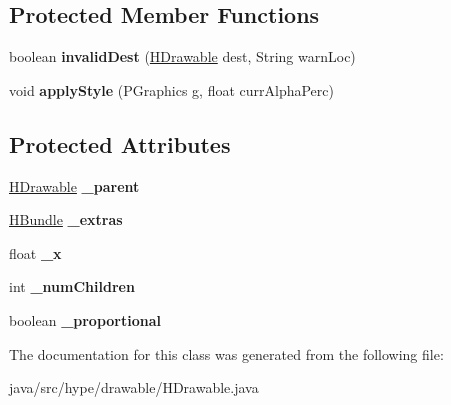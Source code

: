 \subsection*{Protected Member Functions}
\begin{DoxyCompactItemize}
\item 
\hypertarget{classhype_1_1drawable_1_1_h_drawable_a837e3abd69d85cd63b8e602eeba523d1}{boolean {\bfseries invalid\-Dest} (\hyperlink{classhype_1_1drawable_1_1_h_drawable}{H\-Drawable} dest, String warn\-Loc)}\label{classhype_1_1drawable_1_1_h_drawable_a837e3abd69d85cd63b8e602eeba523d1}

\item 
\hypertarget{classhype_1_1drawable_1_1_h_drawable_a1888aed57c719a397222b9e82ed08a4e}{void {\bfseries apply\-Style} (P\-Graphics g, float curr\-Alpha\-Perc)}\label{classhype_1_1drawable_1_1_h_drawable_a1888aed57c719a397222b9e82ed08a4e}

\end{DoxyCompactItemize}
\subsection*{Protected Attributes}
\begin{DoxyCompactItemize}
\item 
\hypertarget{classhype_1_1drawable_1_1_h_drawable_a1f95d00444c6964efa4239ddf135a10e}{\hyperlink{classhype_1_1drawable_1_1_h_drawable}{H\-Drawable} {\bfseries \-\_\-parent}}\label{classhype_1_1drawable_1_1_h_drawable_a1f95d00444c6964efa4239ddf135a10e}

\item 
\hypertarget{classhype_1_1drawable_1_1_h_drawable_a77a64d01b7766ad4d0e338f82ab23f12}{\hyperlink{classhype_1_1util_1_1_h_bundle}{H\-Bundle} {\bfseries \-\_\-extras}}\label{classhype_1_1drawable_1_1_h_drawable_a77a64d01b7766ad4d0e338f82ab23f12}

\item 
\hypertarget{classhype_1_1drawable_1_1_h_drawable_a20c0ae16de46b74c903667ac2db1640a}{float {\bfseries \-\_\-x}}\label{classhype_1_1drawable_1_1_h_drawable_a20c0ae16de46b74c903667ac2db1640a}

\item 
\hypertarget{classhype_1_1drawable_1_1_h_drawable_a1e2205f639598af5f419b82ae5bdc0cf}{int {\bfseries \-\_\-num\-Children}}\label{classhype_1_1drawable_1_1_h_drawable_a1e2205f639598af5f419b82ae5bdc0cf}

\item 
\hypertarget{classhype_1_1drawable_1_1_h_drawable_a7f9bb1ed841a8c8fe52e351ee3bf5844}{boolean {\bfseries \-\_\-proportional}}\label{classhype_1_1drawable_1_1_h_drawable_a7f9bb1ed841a8c8fe52e351ee3bf5844}

\end{DoxyCompactItemize}


The documentation for this class was generated from the following file\-:\begin{DoxyCompactItemize}
\item 
java/src/hype/drawable/H\-Drawable.\-java\end{DoxyCompactItemize}
